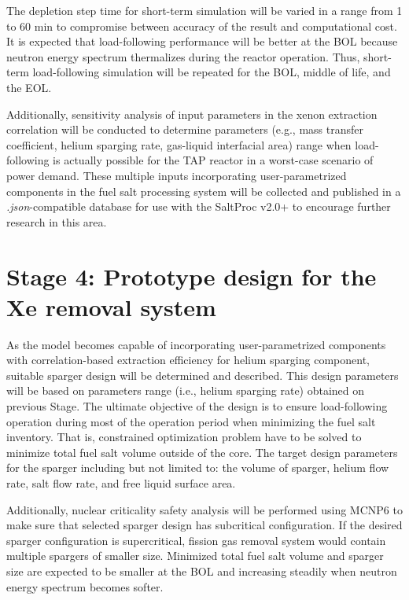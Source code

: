 The depletion step time for short-term simulation will be varied in a range 
from 1 to 60 min to compromise between accuracy of the result and 
computational cost. It is expected that load-following performance will be 
better at the \gls{BOL} because neutron energy spectrum thermalizes during the 
reactor operation. Thus, short-term load-following simulation will be repeated 
for the \gls{BOL}, middle of life, and the \gls{EOL}.

Additionally, sensitivity analysis of input parameters in the xenon extraction 
correlation will be conducted to determine parameters (e.g., mass transfer 
coefficient, helium sparging rate, gas-liquid interfacial area) range when 
load-following is actually possible for the \gls{TAP} 
reactor in a worst-case scenario of power demand. These multiple inputs 
incorporating user-parametrized components in the fuel salt processing 
system will be collected and published in a \textit{.json}-compatible database 
for use with the SaltProc v2.0+ to encourage further research in this area.

\section{Stage 4: Prototype design for the Xe removal system}
As the model becomes capable of incorporating user-parametrized components 
with correlation-based extraction efficiency for helium sparging component, 
suitable sparger design will be determined and described. This design 
parameters will be based on parameters range (i.e., helium sparging rate) 
obtained on previous Stage. The ultimate objective of the design is to ensure 
load-following operation during most of the operation period when minimizing 
the fuel salt inventory. That is, constrained optimization problem have to be 
solved to minimize total fuel salt volume outside of the core. The target 
design parameters for the sparger including but not limited to: the volume of 
sparger, helium flow rate, salt flow rate, and free liquid surface area.

Additionally, nuclear criticality safety analysis will be performed using 
MCNP6 \cite{werner_mcnp6._2018} to make sure that selected sparger design has  
subcritical configuration. If the desired sparger configuration is 
supercritical, fission gas removal system would contain multiple spargers of 
smaller size. Minimized total fuel salt volume and sparger size are expected 
to be smaller at the \gls{BOL} and increasing steadily when neutron energy 
spectrum becomes softer.

